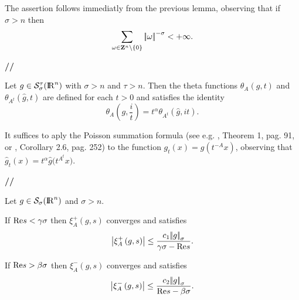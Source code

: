 \documentclass[12pt,a4paper]{amsart}
\begin{document}
{{\removelastskip\par\medskip\goodbreak{}}
The assertion follows immediatly from the previous lemma, observing that
if ${\sigma}>{n}$ then
\begin{equation}\nonumber
\sum_{{\omega}\in{{\bf Z}}^{n}\setminus\{0\}}{\left|\!\left|{\omega}\right|\!\right|}^{-{\sigma}}<+\infty.
\end{equation}
{{\bf //}\par\smallskip}

\begin{theorem}\label{thm::JacobiTransform}
Let ${g}\in{{\mathcal{S}}_{\sigma}^{{\tau}}({{\rm I\kern-.185em R}}^{n})}$
with ${\sigma}>{n}$ and ${\tau}>{n}$.
Then the theta functions
${{\theta}_{{A}}\left({g},{{t}}\right)}$ and
${{\theta}_{{{\left.{{A}}\right.}^t}}\left({\hat{g}},{{t}}\right)}$
are defined for each ${t}>0$ and satisfies the identity
\begin{equation}\label{eq::JacobiTransform}
{{\theta}_{{A}}\left({g},{\frac{i}{t}}\right)}=
{t}^{\alpha}{{\theta}_{{{{\left.{{A}}\right.}^t}}}\left({\hat{g}},{i{t}}\right)}.
\end{equation}
\end{theorem}

{\removelastskip\par\medskip\goodbreak{}}
It suffices to aply the Poisson summation formula 
(see e.g. \cite{book:TenenbaumAnalyticNumberTheory}, Theorem 1, pag. 91,
or \cite{book:SteinAndWeiss}, Corollary 2.6, pag. 252)
to the function
${g}_{t}({x})={g}\left({t}^{-{A}}{x}\right)$,
observing that
$\hat{g}_{t}({x})=
	{t}^{\alpha}
	\hat{g}\bigl({t}^{{{\left.{{A}}\right.}^t}}{x}\bigl)$.
{{\bf //}\par\smallskip}

\begin{lemma}\label{prop::XiPlusEstimate}
Let ${g}\in{{\mathcal{S}}_{\sigma}({{\rm I\kern-.185em R}}^{n})}$ and ${\sigma}>{n}$.

If ${\mathop{\rm Re}\nolimits}{s}<{\gamma}{\sigma}$ then
${{\xi}_{{A}}^+\left({g},{s}\right)}$ converges
and satisfies
\begin{equation}\label{eq::XiPlusEstimate}
{\left|{{{\xi}_{{A}}^+\left({g},{s}\right)}}\right|}\leq
\frac{{c}_1{{\left|\!\left|{g}\right|\!\right|}_{\sigma}}}{{\gamma}{\sigma}-{\mathop{\rm Re}\nolimits}{s}}.
\end{equation}

If ${\mathop{\rm Re}\nolimits}{s}>{\beta}{\sigma}$ then 
${{\xi}_{A}^-\left({g},{s}\right)}$ converges
and satisfies
\begin{equation}\label{eq::XiMinusEstimate}
{\left|{{{\xi}_{A}^-\left({g},{s}\right)}}\right|}\leq
\frac{{c}_2{{\left|\!\left|{g}\right|\!\right|}_{\sigma}}}{{\mathop{\rm Re}\nolimits}{s}-{\beta}{\sigma}}.
\end{equation}


\end{lemma}}
\end{document}
